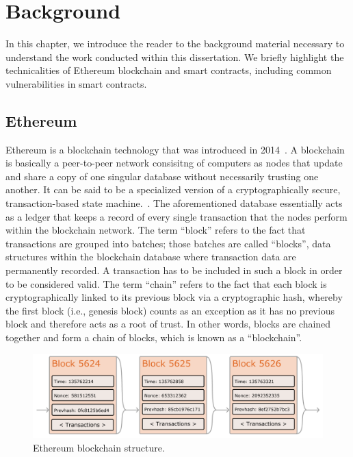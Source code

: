 
\chapter{Background}
\label{chap:background}
    In this chapter, we introduce the reader to the background material necessary to understand the work conducted within this dissertation.
    We briefly highlight the technicalities of Ethereum blockchain and smart contracts, including common vulnerabilities in smart contracts.

\section{Ethereum}
    Ethereum is a blockchain technology that was introduced in 2014~\cite{wood2014ethereum}.
    A blockchain is basically a peer-to-peer network consisitng of computers as nodes that update and share a copy of one singular database without necessarily trusting one another.
    It can be said to be a specialized version of a cryptographically secure, transaction-based state machine.~\cite{wood2014ethereum}.
    The aforementioned database essentially acts as a ledger that keeps a record of every single transaction that the nodes perform within the blockchain network.
    The term “block” refers to the fact that transactions are grouped into batches;
    those batches are called “blocks”, data structures within the blockchain database where transaction data are permanently recorded.
    A transaction has to be included in such a block in order to be considered valid.
    The term “chain” refers to the fact that each block is cryptographically linked to its previous block via a cryptographic hash, whereby the first block (i.e., genesis block) counts as an exception as it has no previous block and therefore acts as a root of trust.
    In other words, blocks are chained together and form a chain of blocks, which is known as a “blockchain”.
    
    \begin{figure}
        \centering
        \includegraphics[width=\textwidth]{figures/ethereum-blocks.png}
        \caption{Ethereum blockchain structure.}
        \label{fig:ethereumBlockchainStructure}
    \end{figure}

